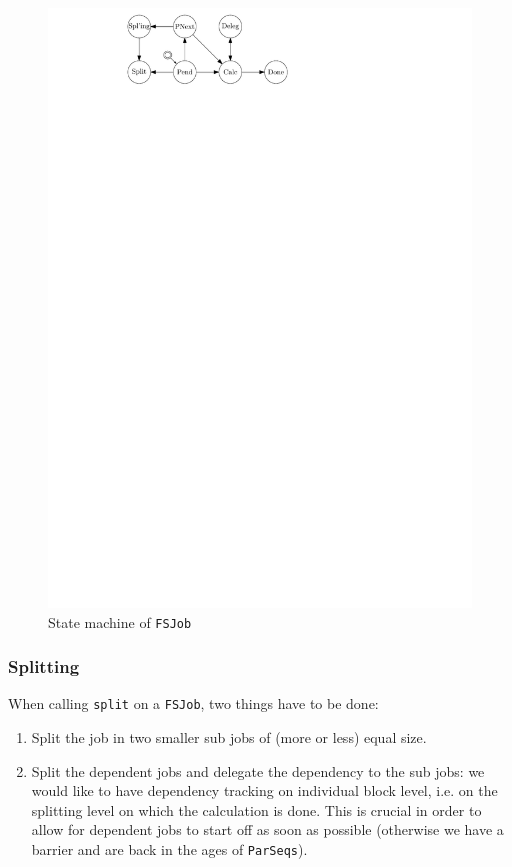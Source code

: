 \documentclass[runningheads,a4paper,fleqn]{llncs}
\begin{document}
\begin{figure}
  \centering
  \includegraphics{fajob-state}
  \caption{State machine of \texttt{FSJob}}
  \label{fig:fajob-state}
\end{figure}

\subsubsection{Splitting}
When calling \texttt{split} on a \texttt{FSJob}, two things have to be
done:
\begin{enumerate}
\item Split the job in two smaller sub jobs of (more or less) equal
  size.
\item Split the dependent jobs and delegate the dependency to the
  sub jobs: we would like to have dependency tracking on individual
  block level, i.e. on the splitting level on which the calculation is 
  done. This is crucial in order to allow for dependent jobs to start
  off as soon as possible (otherwise we have a barrier and are back in
  the ages of \texttt{ParSeqs}).
\end{enumerate}
\end{document}
